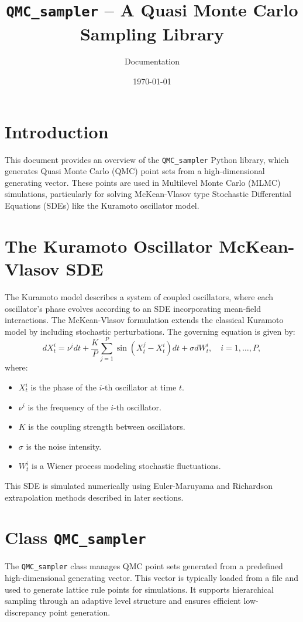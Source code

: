 \documentclass{article}
\title{\texttt{QMC\_sampler} -- A Quasi Monte Carlo Sampling Library}
\author{Documentation}
\date{\today}
\begin{document}
\maketitle

\section{Introduction}
This document provides an overview of the \texttt{QMC\_sampler} Python library, which generates Quasi Monte Carlo (QMC) point sets from a high-dimensional generating vector. These points are used in Multilevel Monte Carlo (MLMC) simulations, particularly for solving McKean-Vlasov type Stochastic Differential Equations (SDEs) like the Kuramoto oscillator model.

\section{The Kuramoto Oscillator McKean-Vlasov SDE}
The Kuramoto model describes a system of coupled oscillators, where each oscillator's phase evolves according to an SDE incorporating mean-field interactions. The McKean-Vlasov formulation extends the classical Kuramoto model by including stochastic perturbations. The governing equation is given by:
\begin{equation}
    dX_t^i = \nu^i dt + \frac{K}{P} \sum_{j=1}^{P} \sin(X_t^j - X_t^i) dt + \sigma dW_t^i, \quad i = 1, \dots, P,
\end{equation}
where:
\begin{itemize}
    \item $X_t^i$ is the phase of the $i$-th oscillator at time $t$.
    \item $\nu^i$ is the  frequency of the $i$-th oscillator.
    \item $K$ is the coupling strength between oscillators.
    \item $\sigma$ is the noise intensity.
    \item $W_t^i$ is a Wiener process modeling stochastic fluctuations.
\end{itemize}
This SDE is simulated numerically using Euler-Maruyama and Richardson extrapolation methods described in later sections.

\section{Class \texttt{QMC\_sampler}}

The \texttt{QMC\_sampler} class manages QMC point sets generated from a predefined high-dimensional generating vector. This vector is typically loaded from a file and used to generate lattice rule points for simulations. It supports hierarchical sampling through an adaptive level structure and ensures efficient low-discrepancy point generation. 
\end{document}
